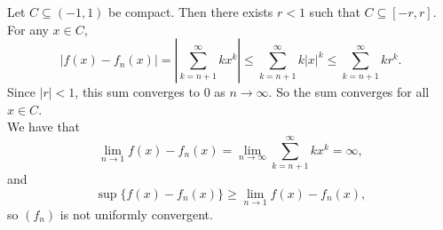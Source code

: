 \documentclass{article}
\begin{document}
Let $C \subseteq (-1, 1)$ be compact. Then there exists $r < 1$ such that $C \subseteq [-r, r]$. For any $x \in C$,
$$|f(x) - f_n(x)| = \left|\sum_{k = n + 1}^\infty kx^k\right| \le \sum_{k = n + 1}^\infty k|x|^k \le \sum_{k = n + 1}^\infty kr^k.$$
Since $|r| < 1$, this sum converges to $0$ as $n \to \infty$. So the sum converges for all $x \in C$. \\

We have that
$$\lim_{n \to 1} f(x) - f_n(x) = \lim_{n \to \infty} \sum_{k = n + 1}^\infty kx^k = \infty,$$
and
$$\sup\{f(x) - f_n(x)\} \ge \lim_{n \to 1} f(x) - f_n(x),$$
so $(f_n)$ is not uniformly convergent.
\end{document}
